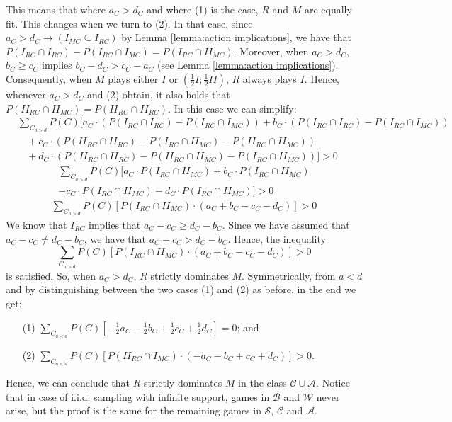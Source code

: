 \documentclass[fleqn,reqno,12pt]{article}
\theoremstyle{Satz}
\theoremstyle{Bsp}
\begin{document}
\noindent This means that where $a_{C}>d_{C}$ and
where (1) is the case, $R$ and $M$ are equally fit. This changes when we turn to (2). In that
case, since $a_{C}>d_{C}\rightarrow(I_{MC}\subseteq I_{RC})$ by Lemma \ref{lemma:action implications}, we have that
$P(I_{RC} \cap I_{RC})-P(I_{RC}\cap I_{MC})=P(I_{RC}\cap II_{MC})$. Moreover, when $a_{C}>d_{C}$, $b_{C}\geq c_{C}$ implies
  $b_{C}-d_{C}>c_{C}-a_{C}$ (see Lemma \ref{lemma:action implications}). Consequently, when $M$ plays either $I$ or $  (\frac{1}{2}I;\frac{1}{2}II)$, $R$ always plays $I$. Hence, whenever $a_{C}>d_{C}$ and (2) obtain, it also holds that $P(II_{RC}\cap II_{MC})=P(II_{RC} \cap II_{RC})$. In this case we can simplify:
\begin{align*}
& \textstyle{\sum_{C_{a>d}}} P(C)[a_{C} \cdot (P(I_{RC}\cap I_{RC}) - P(I_{RC}\cap I_{MC})) + b_{C} \cdot  (P(I_{RC}\cap I_{RC})- P(I_{RC}\cap I_{MC})) \\
& \ \ \ \ + c_{C} \cdot (P(II_{RC}\cap II_{RC})- P(I_{RC}\cap II_{MC})- P(II_{RC}\cap II_{MC})) \\
& \ \ \ \ + d_{C} \cdot (P(II_{RC}\cap II_{RC})- P(II_{RC}\cap II_{MC})- P(I_{RC}\cap II_{MC}))]> 0
\end{align*}
\begin{align*}
\textstyle{\sum_{C_{a>d}}} P(C)[a_{C} \cdot P(I_{RC}\cap II_{MC}) + b_{C} \cdot  P(I_{RC}\cap II_{MC}) \\- c_{C} \cdot P(I_{RC}\cap II_{MC}) - d_{C} \cdot P(I_{RC}\cap II_{MC})]> 0
\end{align*}
\begin{align*}
\textstyle{\sum_{C_{a>d}}} P(C)[P(I_{RC}\cap II_{MC})\cdot (a_{C} + b_{C} - c_{C} - d_{C})]> 0
\end{align*}
\noindent We know that $I_{RC}$ implies that $a_{C}-c_{C}\geq d_{C}-b_{C}$.
Since we have assumed that $a_{C}-c_{C}\neq d_{C}-b_{C}$, we have that
$a_{C}-c_{C} > d_{C}-b_{C}$. Hence, the inequality
$$\sum_{C_{a>d}} P(C)[P(I_{RC}\cap II_{MC})\cdot (a_{C} + b_{C} - c_{C} - d_{C})]> 0$$
is satisfied. So, when $a_{C}>d_{C}$, $R$
strictly dominates $M$. Symmetrically, from $a<d$ and by distinguishing between the two cases
(1) and (2) as before, in the end we get:
\begin{itemize}
\item[(1)] $\sum_{C_{a<d}} P(C)[-\frac{1}{2}a_{C}- \frac{1}{2}b_{C} + \frac{1}{2}c_{C} + \frac{1}{2}d_{C}]= 0$; and
\item[(2)] $\sum_{C_{a<d}} P(C)[P(II_{RC}\cap I_{MC})\cdot (-a_{C} - b_{C} + c_{C} + d_{C})]> 0$.
\end{itemize}
\noindent Hence, we can conclude that $R$ strictly dominates $M$ in the class
$\mathcal{C}\cup\mathcal{A}$. Notice that in case of i.i.d. sampling with infinite support,
games in $\mathcal{B} $ and $\mathcal{W} $ never arise, but the proof is the same for the
remaining games in $\mathcal{S}$, $\mathcal{C} $ and $\mathcal{A}$.
\end{document}
